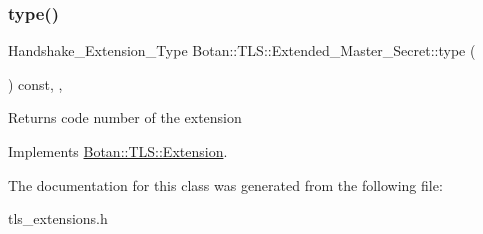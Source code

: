 \subsubsection{\texorpdfstring{type()}{type()}}
{\footnotesize\ttfamily Handshake\+\_\+\+Extension\+\_\+\+Type Botan\+::\+T\+L\+S\+::\+Extended\+\_\+\+Master\+\_\+\+Secret\+::type (\begin{DoxyParamCaption}{ }\end{DoxyParamCaption}) const\hspace{0.3cm}{\ttfamily [inline]}, {\ttfamily [override]}, {\ttfamily [virtual]}}

\begin{DoxyReturn}{Returns}
code number of the extension 
\end{DoxyReturn}


Implements \hyperlink{class_botan_1_1_t_l_s_1_1_extension_ac8819b312ce604453225e7b4f7c373ec}{Botan\+::\+T\+L\+S\+::\+Extension}.



The documentation for this class was generated from the following file\+:\begin{DoxyCompactItemize}
\item 
tls\+\_\+extensions.\+h\end{DoxyCompactItemize}
